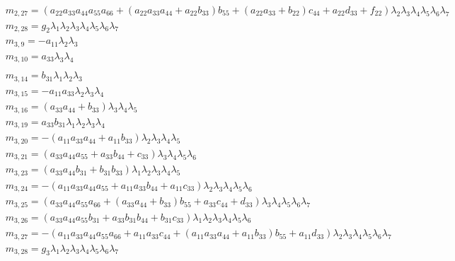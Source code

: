 \documentclass{article}
\begin{document}
\begin{align*}
&m_{2,27}={\left(a_{22} a_{33} a_{44} a_{55} a_{66} + {\left(a_{22} a_{33} a_{44} + a_{22} b_{33}\right)} b_{55} + {\left(a_{22} a_{33} + b_{22}\right)} c_{44} + a_{22} d_{33} + f_{22}\right)} \lambda_{2} \lambda_{3} \lambda_{4} \lambda_{5} \lambda_{6} \lambda_{7}\\
&m_{2,28}=g_{2} \lambda_{1} \lambda_{2} \lambda_{3} \lambda_{4} \lambda_{5} \lambda_{6} \lambda_{7}\\
&m_{3,9}=-a_{11} \lambda_{2} \lambda_{3}\\
&m_{3,10}=a_{33} \lambda_{3} \lambda_{4}\\
\end{align*}
\begin{align*}
&m_{3,14}=b_{31} \lambda_{1} \lambda_{2} \lambda_{3}\\
&m_{3,15}=-a_{11} a_{33} \lambda_{2} \lambda_{3} \lambda_{4}\\
&m_{3,16}={\left(a_{33} a_{44} + b_{33}\right)} \lambda_{3} \lambda_{4} \lambda_{5}\\
&m_{3,19}=a_{33} b_{31} \lambda_{1} \lambda_{2} \lambda_{3} \lambda_{4}\\
&m_{3,20}=-{\left(a_{11} a_{33} a_{44} + a_{11} b_{33}\right)} \lambda_{2} \lambda_{3} \lambda_{4} \lambda_{5}\\
&m_{3,21}={\left(a_{33} a_{44} a_{55} + a_{33} b_{44} + c_{33}\right)} \lambda_{3} \lambda_{4} \lambda_{5} \lambda_{6}\\
&m_{3,23}={\left(a_{33} a_{44} b_{31} + b_{31} b_{33}\right)} \lambda_{1} \lambda_{2} \lambda_{3} \lambda_{4} \lambda_{5}\\
&m_{3,24}=-{\left(a_{11} a_{33} a_{44} a_{55} + a_{11} a_{33} b_{44} + a_{11} c_{33}\right)} \lambda_{2} \lambda_{3} \lambda_{4} \lambda_{5} \lambda_{6}\\
&m_{3,25}={\left(a_{33} a_{44} a_{55} a_{66} + {\left(a_{33} a_{44} + b_{33}\right)} b_{55} + a_{33} c_{44} + d_{33}\right)} \lambda_{3} \lambda_{4} \lambda_{5} \lambda_{6} \lambda_{7}\\
&m_{3,26}={\left(a_{33} a_{44} a_{55} b_{31} + a_{33} b_{31} b_{44} + b_{31} c_{33}\right)} \lambda_{1} \lambda_{2} \lambda_{3} \lambda_{4} \lambda_{5} \lambda_{6}\\
&m_{3,27}=-{\left(a_{11} a_{33} a_{44} a_{55} a_{66} + a_{11} a_{33} c_{44} + {\left(a_{11} a_{33} a_{44} + a_{11} b_{33}\right)} b_{55} + a_{11} d_{33}\right)} \lambda_{2} \lambda_{3} \lambda_{4} \lambda_{5} \lambda_{6} \lambda_{7}\\
&m_{3,28}=g_{3} \lambda_{1} \lambda_{2} \lambda_{3} \lambda_{4} \lambda_{5} \lambda_{6} \lambda_{7}\\

\end{align*}
\end{document}

